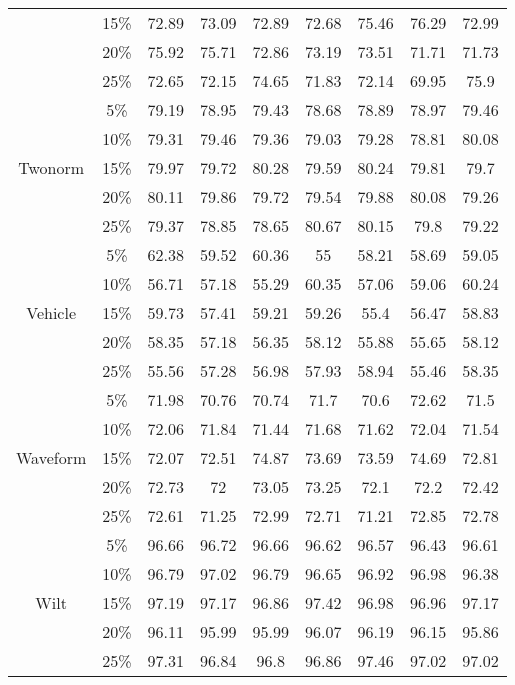 \begin{longtable}[c]{|c|c|c|c|c|c|c|c|c|}
& 15\% & 72.89 & 73.09 & 72.89 & 72.68 & 75.46 & 76.29 & 72.99 \\
& 20\% & 75.92 & 75.71 & 72.86 & 73.19 & 73.51 & 71.71 & 71.73 \\
& 25\% & 72.65 & 72.15 & 74.65 & 71.83 & 72.14 & 69.95 & 75.9 \\ \hline
\multirow{5}{*}{Twonorm}
& 5\% & 79.19 & 78.95 & 79.43 & 78.68 & 78.89 & 78.97 & 79.46 \\ 
& 10\% & 79.31 & 79.46 & 79.36 & 79.03 & 79.28 & 78.81 & 80.08 \\
& 15\% & 79.97 & 79.72 & 80.28 & 79.59 & 80.24 & 79.81 & 79.7 \\
& 20\% & 80.11 & 79.86 & 79.72 & 79.54 & 79.88 & 80.08 & 79.26 \\
& 25\% & 79.37 & 78.85 & 78.65 & 80.67 & 80.15 & 79.8 & 79.22 \\ \hline
\multirow{5}{*}{Vehicle}
& 5\% & 62.38 & 59.52 & 60.36 & 55 & 58.21 & 58.69 & 59.05 \\ 
& 10\% & 56.71 & 57.18 & 55.29 & 60.35 & 57.06 & 59.06 & 60.24 \\
& 15\% & 59.73 & 57.41 & 59.21 & 59.26 & 55.4 & 56.47 & 58.83 \\
& 20\% & 58.35 & 57.18 & 56.35 & 58.12 & 55.88 & 55.65 & 58.12 \\
& 25\% & 55.56 & 57.28 & 56.98 & 57.93 & 58.94 & 55.46 & 58.35 \\ \hline
\multirow{5}{*}{Waveform}
& 5\% & 71.98 & 70.76 & 70.74 & 71.7 & 70.6 & 72.62 & 71.5 \\ 
& 10\% & 72.06 & 71.84 & 71.44 & 71.68 & 71.62 & 72.04 & 71.54 \\
& 15\% & 72.07 & 72.51 & 74.87 & 73.69 & 73.59 & 74.69 & 72.81 \\
& 20\% & 72.73 & 72 & 73.05 & 73.25 & 72.1 & 72.2 & 72.42 \\
& 25\% & 72.61 & 71.25 & 72.99 & 72.71 & 71.21 & 72.85 & 72.78 \\ \hline
\multirow{5}{*}{Wilt}
& 5\% & 96.66 & 96.72 & 96.66 & 96.62 & 96.57 & 96.43 & 96.61 \\ 
& 10\% & 96.79 & 97.02 & 96.79 & 96.65 & 96.92 & 96.98 & 96.38 \\
& 15\% & 97.19 & 97.17 & 96.86 & 97.42 & 96.98 & 96.96 & 97.17 \\
& 20\% & 96.11 & 95.99 & 95.99 & 96.07 & 96.19 & 96.15 & 95.86 \\
& 25\% & 97.31 & 96.84 & 96.8 & 96.86 & 97.46 & 97.02 & 97.02 \\ \hline
\end{longtable}

